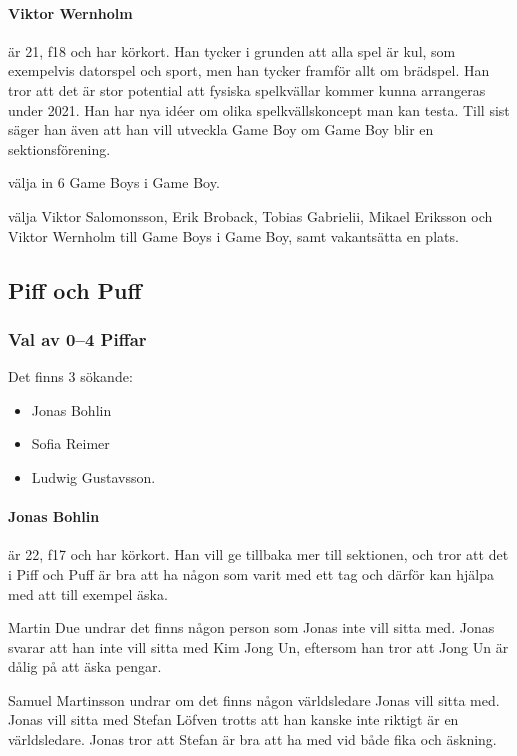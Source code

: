 \documentclass[hidelinks]{sektionsmote}
\begin{document}
\paragraph{Viktor Wernholm} är 21, f18 och har körkort.
Han tycker i grunden att alla spel är kul, som exempelvis datorspel och sport, men han tycker framför allt om brädspel.
Han tror att det är stor potential att fysiska spelkvällar kommer kunna arrangeras under 2021.
Han har nya idéer om olika spelkvällskoncept man kan testa.
Till sist säger han även att han vill utveckla Game Boy om Game Boy blir en sektionsförening.

\begin{beslut}
  \item välja in 6 Game Boys i Game Boy.
  \item välja Viktor Salomonsson, Erik Broback, Tobias Gabrielii, Mikael Eriksson och Viktor Wernholm till Game Boys i Game Boy, samt vakantsätta en plats.
\end{beslut}


\subsection{Piff och Puff}
\subsubsection{Val av 0--4 Piffar}
Det finns 3 sökande:
\begin{itemize}
    \item Jonas Bohlin
    \item Sofia Reimer
    \item Ludwig Gustavsson.
\end{itemize}

\paragraph{Jonas Bohlin} är 22, f17 och har körkort.
Han vill ge tillbaka mer till sektionen, och tror att det i Piff och Puff är bra att ha någon som varit med ett tag och därför kan hjälpa med att till exempel äska.

Martin Due undrar det finns någon person som Jonas inte vill sitta med.
Jonas svarar att han inte vill sitta med Kim Jong Un, eftersom han tror att Jong Un är dålig på att äska pengar.

Samuel Martinsson undrar om det finns någon världsledare Jonas vill sitta med.
Jonas vill sitta med Stefan Löfven trotts att han kanske inte riktigt är en världsledare.
Jonas tror att Stefan är bra att ha med vid både fika och äskning.
\end{document}
